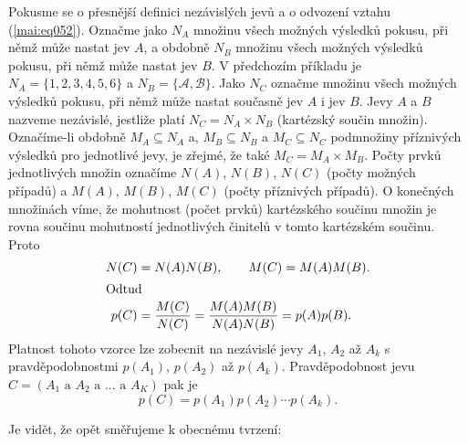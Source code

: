       Pokusme se o přesnější definici nezávislých jevů a o odvození vztahu (\ref{mai:eq052}). 
      Označme jako \(N_A\) množinu všech možných výsledků pokusu, při němž může nastat jev \(A\), a 
      obdobně \(N_B\) množinu všech možných výsledků pokusu, při němž může nastat jev \(B\). V 
      předchozím příkladu je \(N_A = \{1, 2, 3, 4, 5, 6\}\) a \(N_B = \{\mathcal{A}, 
      \mathcal{B}\}\). Jako \(N_C\) označme množinu všech možných výsledků pokusu, při němž může 
      nastat současně jev \(A\) i jev \(B\). Jevy \(A\) a \(B\) nazveme nezávislé, jestliže
      platí \(N_C = N_A \times N_B\) (kartézský součin množin). Označíme-li obdobně \(M_A \subseteq 
      N_A\) a, \(M_B \subseteq N_B\) a \(M_C \subseteq N_C\) podmnožiny příznivých výsledků pro 
      jednotlivé jevy, je zřejmé, že také \(M_C = M_A \times M_B\). Počty prvků jednotlivých množin 
      označíme \(N(A)\), \(N(B)\), \(N(C)\) (počty možných případů) a \(M(A)\), \(M(B)\), \(M(C)\) 
      (počty příznivých případů). O konečných množinách víme, že mohutnost (počet prvků) 
      kartézského součinu množin je rovna součinu mohutností jednotlivých
      činitelů v tomto kartézském součinu. Proto
      \begin{align*}
        N(C) &= N(A)N(B),\qquad M(C) = M(A)M(B). \\
        \shortintertext{Odtud}
        p(C) &= \dfrac{M(C)}{N(C)} = \dfrac{M(A)M(B)}{N(A)N(B)} = p(A)p(B).
      \end{align*}
      Platnost tohoto vzorce lze zobecnit na nezávislé jevy \(A_1\), \(A_2\) až \(A_k\) s 
      pravděpodobnostmi \(p(A_1)\), \(p(A_2)\) až \(p(A_k)\). Pravděpodobnost jevu \(C = (A_1\text{ 
      a }A_2\text{ a }...\text{ a }A_K)\) pak je
      \begin{equation*}
        p(C) = p(A_1)p(A_2)\cdots p(A_k).
      \end{equation*}
 
      
      
      Je vidět, že opět směřujeme k obecnému tvrzení:
      
      
